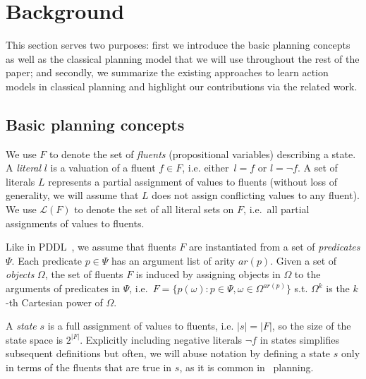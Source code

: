
\section{Background}
\label{sec:background}

This section serves two purposes: first we introduce the basic planning concepts as well as the classical planning model that we will use throughout the rest of the paper; and secondly, we summarize the existing approaches to learn action models in classical planning and highlight our contributions via the related work.


\subsection{Basic planning concepts}
\label{basic_planning}


We use $F$ to denote the set of {\em fluents} (propositional variables) describing a state. A {\em literal} $l$ is a valuation of a fluent $f\in F$, i.e. either~$l=f$ or $l=\neg f$. A set of literals $L$ represents a partial assignment of values to fluents (without loss of generality, we will assume that $L$ does not assign conflicting values to any fluent). We use $\mathcal{L}(F)$ to denote the set of all literal sets on $F$, i.e.~all partial assignments of values to fluents.

Like in PDDL~\cite{fox2003pddl2}, we assume that fluents $F$ are instantiated from a set of {\em predicates} $\Psi$. Each predicate $p\in\Psi$ has an argument list of arity $ar(p)$. Given a set of {\em objects} $\Omega$, the set of fluents $F$ is induced by assigning objects in $\Omega$ to the arguments of predicates in $\Psi$, i.e.~$F=\{p(\omega):p\in\Psi,\omega\in\Omega^{ar(p)}\}$ s.t. $\Omega^k$ is the $k$-th Cartesian power of $\Omega$.

A {\em state} $s$ is a full assignment of values to fluents, i.e. $|s|=|F|$, so the size of the state space is $2^{|F|}$. Explicitly including negative literals $\neg f$ in states simplifies subsequent definitions but often, we will abuse notation by defining a state $s$ only in terms of the fluents that are true in $s$, as it is common in \strips\ planning.

